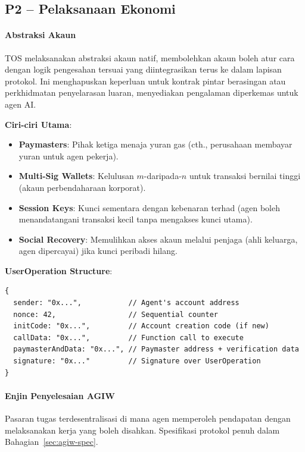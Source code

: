 \documentclass[11pt]{article}
\begin{document}
\subsection{P2 -- Pelaksanaan Ekonomi}
\label{sec:pillar-economic}

\paragraph{Abstraksi Akaun}
TOS melaksanakan abstraksi akaun natif, membolehkan akaun boleh atur cara dengan logik pengesahan tersuai yang diintegrasikan terus ke dalam lapisan protokol. Ini menghapuskan keperluan untuk kontrak pintar berasingan atau perkhidmatan penyelarasan luaran, menyediakan pengalaman diperkemas untuk agen AI.

\textbf{Ciri-ciri Utama}:
\begin{itemize}[noitemsep]
  \item \textbf{Paymasters}: Pihak ketiga menaja yuran gas (cth., perusahaan membayar yuran untuk agen pekerja).
  \item \textbf{Multi-Sig Wallets}: Kelulusan $m$-daripada-$n$ untuk transaksi bernilai tinggi (akaun perbendaharaan korporat).
  \item \textbf{Session Keys}: Kunci sementara dengan kebenaran terhad (agen boleh menandatangani transaksi kecil tanpa mengakses kunci utama).
  \item \textbf{Social Recovery}: Memulihkan akses akaun melalui penjaga (ahli keluarga, agen dipercayai) jika kunci peribadi hilang.
\end{itemize}

\textbf{UserOperation Structure}:
\begin{verbatim}
{
  sender: "0x...",           // Agent's account address
  nonce: 42,                 // Sequential counter
  initCode: "0x...",         // Account creation code (if new)
  callData: "0x...",         // Function call to execute
  paymasterAndData: "0x...", // Paymaster address + verification data
  signature: "0x..."         // Signature over UserOperation
}
\end{verbatim}

\paragraph{Enjin Penyelesaian AGIW}
Pasaran tugas terdesentralisasi di mana agen memperoleh pendapatan dengan melaksanakan kerja yang boleh disahkan. Spesifikasi protokol penuh dalam Bahagian~\ref{sec:agiw-spec}.
\end{document}
